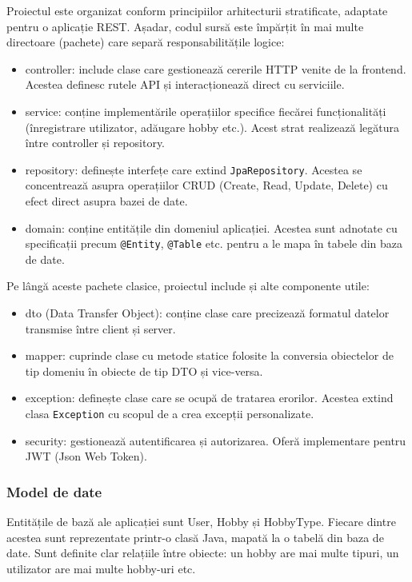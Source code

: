 \par
Proiectul este organizat conform principiilor arhitecturii stratificate, adaptate pentru o aplicație REST. 
Așadar, codul sursă este împărțit în mai multe directoare (pachete) care separă responsabilitățile logice: 
\begin{itemize}
    \item controller: include clase care gestionează cererile HTTP venite de la frontend. Acestea definesc rutele API și interacționează direct cu serviciile.
    \item service: conține implementările operațiilor specifice fiecărei funcționalități (înregistrare utilizator, adăugare hobby etc.). Acest strat realizează legătura între controller și repository. 
    \item repository: definește interfețe care extind \texttt{JpaRepository}. Acestea se concentrează asupra operațiilor CRUD (Create, Read, Update, Delete) cu efect direct asupra bazei de date.
    \item domain: conține entitățile din domeniul aplicației. Acestea sunt adnotate cu specificații precum \texttt{@Entity}, \texttt{@Table} etc. pentru a le mapa în tabele din baza de date.
\end{itemize}  
Pe lângă aceste pachete clasice, proiectul include și alte componente utile:
\begin{itemize} 
    \item dto (Data Transfer Object): conține clase care precizează formatul datelor transmise între client și server.
    \item mapper: cuprinde clase cu metode statice folosite la conversia obiectelor de tip domeniu în obiecte de tip DTO și vice-versa.
    \item exception: definește clase care se ocupă de tratarea erorilor. Acestea extind clasa \texttt{Exception} cu scopul de a crea excepții personalizate.
    \item security: gestionează autentificarea și autorizarea. Oferă implementare pentru JWT (Json Web Token).
\end{itemize}
\subsubsection*{Model de date}
Entitățile de bază ale aplicației sunt User, Hobby și HobbyType. Fiecare dintre acestea sunt reprezentate printr-o clasă Java, mapată la o tabelă din baza de date.
Sunt definite clar relațiile între obiecte: un hobby are mai multe tipuri, un utilizator are mai multe hobby-uri etc.

